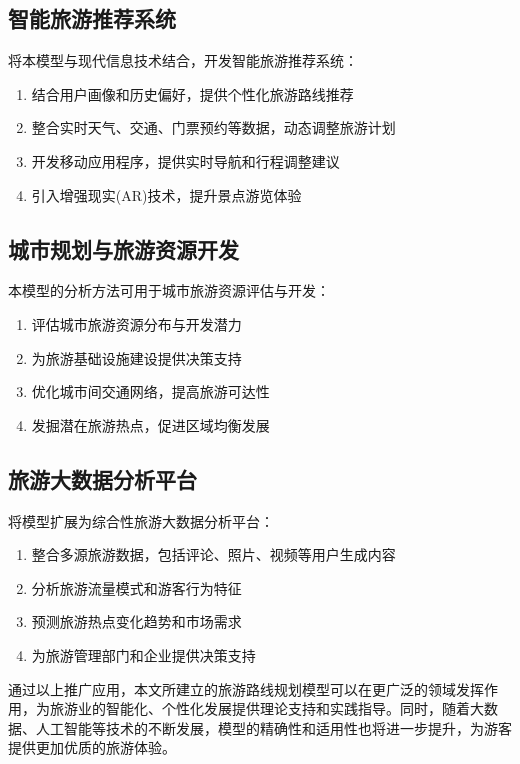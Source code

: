\documentclass[withoutpreface,bwprint]{cumcmthesis} %
\begin{document}
\subsection{智能旅游推荐系统}
将本模型与现代信息技术结合，开发智能旅游推荐系统：
\begin{enumerate}
    \item 结合用户画像和历史偏好，提供个性化旅游路线推荐
    \item 整合实时天气、交通、门票预约等数据，动态调整旅游计划
    \item 开发移动应用程序，提供实时导航和行程调整建议
    \item 引入增强现实(AR)技术，提升景点游览体验
\end{enumerate}

\subsection{城市规划与旅游资源开发}
本模型的分析方法可用于城市旅游资源评估与开发：
\begin{enumerate}
    \item 评估城市旅游资源分布与开发潜力
    \item 为旅游基础设施建设提供决策支持
    \item 优化城市间交通网络，提高旅游可达性
    \item 发掘潜在旅游热点，促进区域均衡发展
\end{enumerate}

\subsection{旅游大数据分析平台}
将模型扩展为综合性旅游大数据分析平台：
\begin{enumerate}
    \item 整合多源旅游数据，包括评论、照片、视频等用户生成内容
    \item 分析旅游流量模式和游客行为特征
    \item 预测旅游热点变化趋势和市场需求
    \item 为旅游管理部门和企业提供决策支持
\end{enumerate}

通过以上推广应用，本文所建立的旅游路线规划模型可以在更广泛的领域发挥作用，为旅游业的智能化、个性化发展提供理论支持和实践指导。同时，随着大数据、人工智能等技术的不断发展，模型的精确性和适用性也将进一步提升，为游客提供更加优质的旅游体验。

\newpage %

\end{document}
